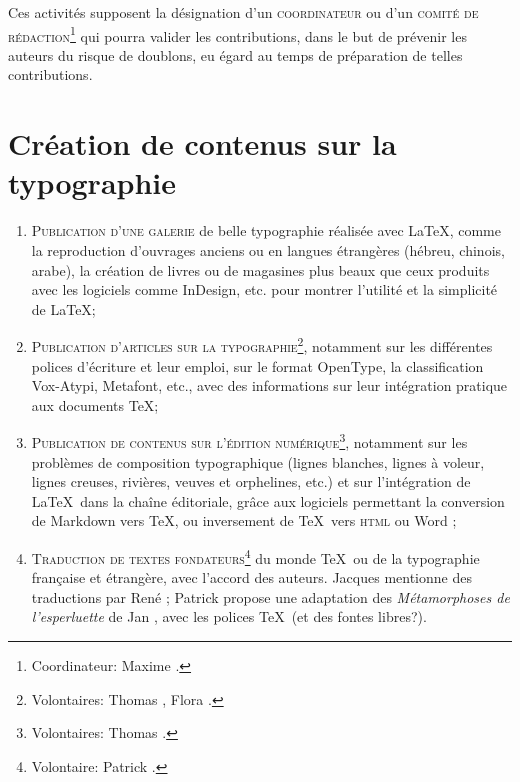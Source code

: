 \documentclass{tufte-handout}
\newcommand{\ratio}[3][]{\marginpar{\footnotesize{\textcolor{teal}{Temps requis: #2 / Utilité: #3}\par\noindent \textcolor{teal}{#1}}}}
\begin{document}
Ces activités supposent la désignation d'un \textsc{coordinateur}\ratio[Potentiellement chronophage]{++}{++} ou d'un \textsc{comité de rédaction}\footnote{Coordinateur: Maxime .} qui pourra valider les contributions, dans le but de prévenir les auteurs du risque de doublons, eu égard au temps de préparation de telles contributions.


\section{Création de contenus sur la typographie}

\begin{enumerate}
	\item\textsc{Publication d'une galerie}\ratio[Les documents existent]{+}{+++} de belle typographie réalisée avec \LaTeX, comme la reproduction d'ouvrages anciens ou en langues étrangères (hébreu, chinois, arabe), la création de livres ou de magasines plus beaux que ceux produits avec les logiciels comme InDesign, etc. pour montrer l'utilité et la simplicité de \LaTeX ;
	\item\textsc{Publication d'articles sur la typographie}\ratio[Individuellement assez peu chronophage, d'autant que certaines ressources existent]{++}{++}\footnote{Volontaires: Thomas , Flora .}, notamment sur les différentes polices d'écriture et leur emploi, sur le format OpenType, la classification Vox-Atypi, Metafont, etc., avec des informations sur leur intégration pratique aux documents \TeX ;
	\item\textsc{Publication de contenus sur l'édition numérique}\ratio[Individuellement assez peu chronophage, d'autant que certaines ressources existent]{++}{++}\footnote{Volontaires: Thomas .}, notamment sur les problèmes de composition typographique (lignes blanches, lignes à voleur, lignes creuses, rivières, veuves et orphelines, etc.) et sur l'intégration de \LaTeX\ dans la chaîne éditoriale, grâce aux logiciels permettant la conversion de Markdown vers \TeX, ou inversement de \TeX\ vers \textsc{html} ou Word ;
	\item\textsc{Traduction de textes fondateurs}\ratio[Chronophage]{+++}{+}\footnote{Volontaire: Patrick .} du monde \TeX\ ou de la typographie française et étrangère, avec l'accord des auteurs. Jacques  mentionne des traductions par René ; Patrick  propose une adaptation des \emph{Métamorphoses de l'esperluette} de Jan , avec les polices \TeX~(et des fontes libres?).
\end{enumerate}
\end{document}
